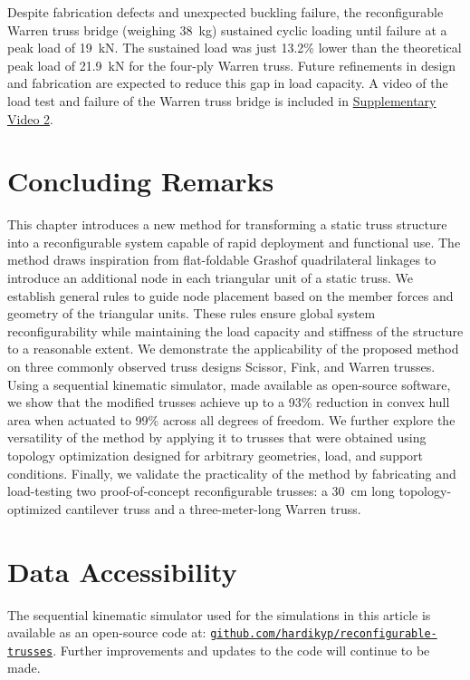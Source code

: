 Despite fabrication defects and unexpected buckling failure, the reconfigurable Warren truss bridge (weighing 38~kg) sustained cyclic loading until failure at a peak load of 19~kN. The sustained load was just 13.2\% lower than the theoretical peak load of 21.9~kN for the four-ply Warren truss. Future refinements in design and fabrication are expected to reduce this gap in load capacity. A video of the load test and failure of the Warren truss bridge is included in \hyperref[fig-supplementary-video-2]{Supplementary Video 2}.

\section{Concluding Remarks}\label{02-sec-conclusion}
This chapter introduces a new method for transforming a static truss structure into a reconfigurable system capable of rapid deployment and functional use. The method draws inspiration from flat-foldable Grashof quadrilateral linkages to introduce an additional node in each triangular unit of a static truss. We establish general rules to guide node placement based on the member forces and geometry of the triangular units. These rules ensure global system reconfigurability while maintaining the load capacity and stiffness of the structure to a reasonable extent. We demonstrate the applicability of the proposed method on three commonly observed truss designs \textemdash{} Scissor, Fink, and Warren trusses. Using a sequential kinematic simulator, made available as open-source software, we show that the modified trusses achieve up to a 93\% reduction in convex hull area when actuated to 99\% across all degrees of freedom. We further explore the versatility of the method by applying it to trusses that were obtained using topology optimization designed for arbitrary geometries, load, and support conditions. Finally, we validate the practicality of the method by fabricating and load-testing two proof-of-concept reconfigurable trusses: a 30~cm long topology-optimized cantilever truss and a three-meter-long Warren truss.

\section{Data Accessibility}\label{02-sec-data}
The sequential kinematic simulator used for the simulations in this article is available as an open-source code at: \href{https://github.com/hardikyp/reconfigurable-trusses}{\nolinkurl{github.com/hardikyp/reconfigurable-trusses}}. Further improvements and updates to the code will continue to be made.